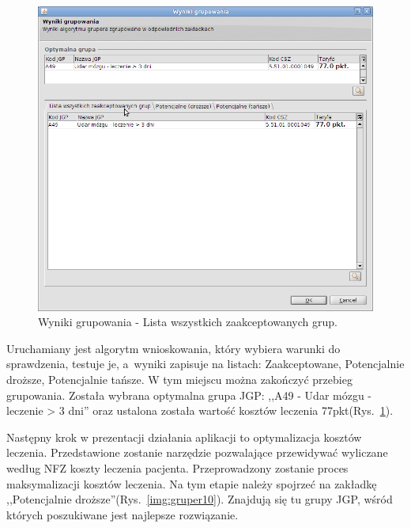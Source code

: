 \begin{figure}%
\centering
\includegraphics[scale=0.4]{images/gruper9}
\caption[Widok grupera]{Wyniki grupowania - Lista wszystkich zaakceptowanych grup.}
\label{img:gruper9}
\end{figure}

Uruchamiany jest algorytm wnioskowania, który wybiera warunki do sprawdzenia, testuje je, a~wyniki zapisuje na listach: Zaakceptowane, Potencjalnie droższe, Potencjalnie tańsze. W tym miejscu można zakończyć przebieg grupowania. Została wybrana optymalna grupa JGP: ,,A49 - Udar mózgu - leczenie > 3 dni'' oraz ustalona została wartość kosztów leczenia 77pkt(Rys.~\ref{img:gruper9}).

Następny krok w prezentacji działania aplikacji to optymalizacja kosztów leczenia. Przedstawione zostanie narzędzie pozwalające przewidywać wyliczane według NFZ koszty leczenia pacjenta. Przeprowadzony zostanie proces maksymalizacji kosztów leczenia. Na tym etapie należy spojrzeć na zakładkę ,,Potencjalnie droższe''(Rys.~\ref{img:gruper10}). Znajdują się tu grupy JGP, wśród których poszukiwane jest najlepsze rozwiązanie.

